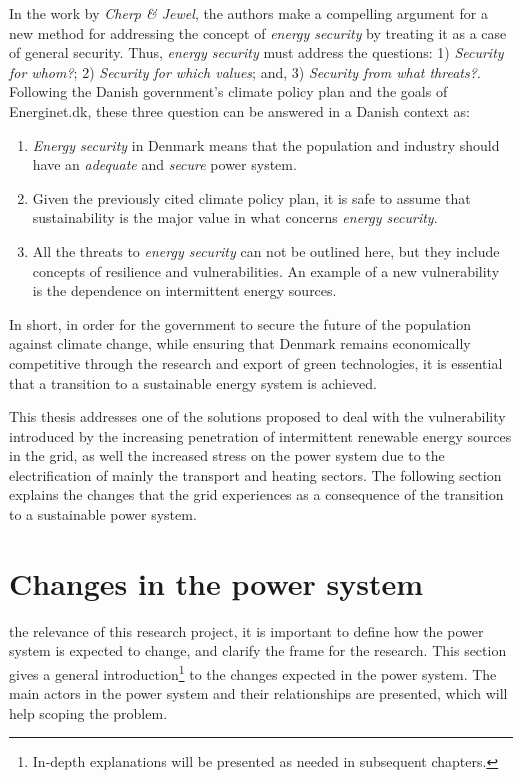 In the work by \textit{Cherp \& Jewel}, the authors make a compelling argument for a new method for addressing the concept of \emph{energy security} by treating it as a case of general security. Thus, \emph{energy security} must address the questions: 1) \emph{Security for whom?}; 2) \emph{Security for which values}; and, 3) \emph{Security from what threats?}. Following the Danish government's climate policy plan and the goals of Energinet.dk, these three question can be answered in a Danish context as:
\begin{enumerate}
	\item \emph{Energy security} in Denmark means that the population and industry should have an \emph{adequate} and \emph{secure} power system.
	\item Given the previously cited climate policy plan, it is safe to assume that sustainability is the major value in what concerns \emph{energy security}.
	\item All the threats to \emph{energy security} can not be outlined here, but they include concepts of resilience and vulnerabilities. An example of a new vulnerability is the dependence on intermittent energy sources.
\end{enumerate}

In short, in order for the government to secure the future of the population against climate change, while ensuring that Denmark remains economically competitive through the research and export of green technologies, it is essential that a transition to a sustainable energy system is achieved. 

This thesis addresses one of the solutions proposed to deal with the vulnerability introduced by the increasing penetration of intermittent renewable energy sources in the grid, as well the increased stress on the power system due to the electrification of mainly the transport and heating sectors. The following section explains the changes that the grid experiences as a consequence of the transition to a sustainable power system.
\section{Changes in the power system}%
\label{sec:powsysdesc}
  the relevance of this research project, it is important to define how the power system is expected to change, and clarify the frame for the research. This section gives a general introduction\footnote[2\baselineskip]{In-depth explanations will be presented as needed in subsequent chapters.} to the changes expected in the power system. The main actors in the power system and their relationships are presented, which will help scoping the problem.
